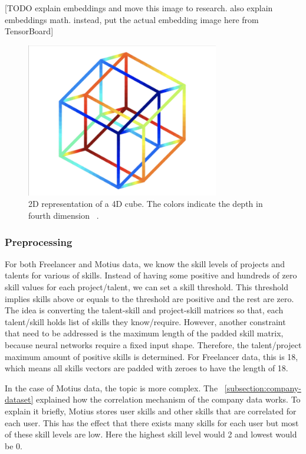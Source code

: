[TODO explain embeddings and move this image to research. also explain embeddings math. instead, put the actual embedding image here from TensorBoard]
 \begin{figure}[!ht]
	\centering
	\includegraphics[width=0.75\textwidth]{figures/DimensionalityReduction.png}
	\caption{2D representation of a 4D cube. The colors indicate the depth in fourth dimension ~\parencite{lee2007nonlinear}.}
	\label{fig:embedding-projection}
\end{figure}


\subsubsection{Preprocessing}

For both Freelancer and Motius data, we know the skill levels of projects and talents for various of skills. Instead of having some positive and hundreds of zero skill values for each project/talent, we can set a skill threshold. This threshold implies skills above or equals to the threshold are positive and the rest are zero. The idea is converting the talent-skill and project-skill matrices so that, each talent/skill holds list of skills they know/require. However, another constraint that need to be addressed is the maximum length of the padded skill matrix, because neural networks require a fixed input shape. Therefore, the talent/project maximum amount of positive skills is determined. For Freelancer data, this is 18, which means all skills vectors are padded with zeroes to have the length of 18. 

In the case of Motius data, the topic is more complex. The ~\autoref{subsection:company-dataset} explained how the correlation mechanism of the company data works. To explain it briefly, Motius stores user skills and other skills that are correlated for each user. This has the effect that there exists many skills for each user but most of these skill levels are low. Here the highest skill level would 2 and lowest would be 0.

